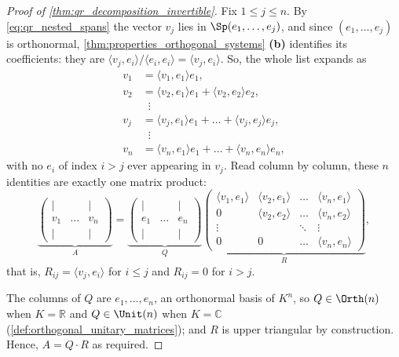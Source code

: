 \begin{proof}[Proof of \cref{thm:qr_decomposition_invertible}]
Fix $1 \le j \le n$. By \eqref{eq:qr_nested_spans} the vector $v_j$ lies in $\Sp(e_1, \dots, e_j)$, and since $(e_1, \dots, e_j)$ is orthonormal, \cref{thm:properties_orthogonal_systems} \textbf{(b)} identifies its coefficients: they are $\langle v_j, e_i \rangle / \langle e_i, e_i \rangle = \langle v_j, e_i \rangle$. So, the whole list expands as
\begin{align*}
    v_1 &= \langle v_1, e_1 \rangle e_1, \\
    v_2 &= \langle v_2, e_1 \rangle e_1 + \langle v_2, e_2 \rangle e_2, \\
        &\;\;\vdots \\
    v_j &= \langle v_j, e_1 \rangle e_1 + \dots + \langle v_j, e_j \rangle e_j, \\
        &\;\;\vdots \\
    v_n &= \langle v_n, e_1 \rangle e_1 + \dots + \langle v_n, e_n \rangle e_n,
\end{align*}
with no $e_i$ of index $i > j$ ever appearing in $v_j$. Read column by column, these $n$ identities are exactly one matrix product:
\[
    \underbrace{\begin{pmatrix} | & & | \\ v_1 & \dots & v_n \\ | & & | \end{pmatrix}}_{A}
    = \underbrace{\begin{pmatrix} | & & | \\ e_1 & \dots & e_n \\ | & & | \end{pmatrix}}_{Q}
      \underbrace{\begin{pmatrix}
        \langle v_1, e_1 \rangle & \langle v_2, e_1 \rangle & \dots & \langle v_n, e_1 \rangle \\
        0 & \langle v_2, e_2 \rangle & \dots & \langle v_n, e_2 \rangle \\
        \vdots & & \ddots & \vdots \\
        0 & 0 & \dots & \langle v_n, e_n \rangle
      \end{pmatrix}}_{R},
\]
that is, $R_{ij} = \langle v_j, e_i \rangle$ for $i \le j$ and $R_{ij} = 0$ for $i > j$.

The columns of $Q$ are $e_1, \dots, e_n$, an orthonormal basis of $K^n$, so $Q \in \Orth(n)$ when $K = \mathbb{R}$ and $Q \in \Unit(n)$ when $K = \mathbb{C}$ (\cref{def:orthogonal_unitary_matrices}); and $R$ is upper triangular by construction. Hence, $A = Q \cdot R$ as required.
\end{proof}

